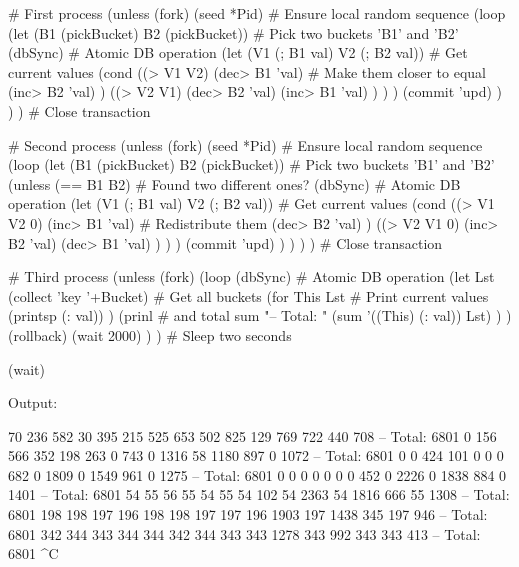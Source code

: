 \begin{wideverbatim}

# First process
(unless (fork)
   (seed *Pid)  # Ensure local random sequence
   (loop
      (let (B1 (pickBucket)  B2 (pickBucket))  # Pick two buckets 'B1' and 'B2'
         (dbSync)                              # Atomic DB operation
         (let (V1 (; B1 val)  V2 (; B2 val))   # Get current values
            (cond
               ((> V1 V2)
                  (dec> B1 'val)               # Make them closer to equal
                  (inc> B2 'val) )
               ((> V2 V1)
                  (dec> B2 'val)
                  (inc> B1 'val) ) ) )
         (commit 'upd) ) ) )                   # Close transaction

\end{wideverbatim}

\begin{wideverbatim}

# Second process
(unless (fork)
   (seed *Pid)  # Ensure local random sequence
   (loop
      (let (B1 (pickBucket)  B2 (pickBucket))  # Pick two buckets 'B1' and 'B2'
         (unless (== B1 B2)                    # Found two different ones?
            (dbSync)                              # Atomic DB operation
            (let (V1 (; B1 val)  V2 (; B2 val))   # Get current values
               (cond
                  ((> V1 V2 0)
                     (inc> B1 'val)               # Redistribute them
                     (dec> B2 'val) )
                  ((> V2 V1 0)
                     (inc> B2 'val)
                     (dec> B1 'val) ) ) )
            (commit 'upd) ) ) ) )                 # Close transaction


\end{wideverbatim}

\begin{wideverbatim}

# Third process
(unless (fork)
   (loop
      (dbSync)                         # Atomic DB operation
      (let Lst (collect 'key '+Bucket) # Get all buckets
         (for This Lst                 # Print current values
            (printsp (: val)) )
         (prinl                        # and total sum
            "-- Total: "
            (sum '((This) (: val)) Lst) ) )
      (rollback)
      (wait 2000) ) )                  # Sleep two seconds

(wait)

\end{wideverbatim}

\begin{wideverbatim}

Output:

70 236 582 30 395 215 525 653 502 825 129 769 722 440 708 -- Total: 6801
0 156 566 352 198 263 0 743 0 1316 58 1180 897 0 1072 -- Total: 6801
0 0 424 101 0 0 0 682 0 1809 0 1549 961 0 1275 -- Total: 6801
0 0 0 0 0 0 0 452 0 2226 0 1838 884 0 1401 -- Total: 6801
54 55 56 55 54 55 54 102 54 2363 54 1816 666 55 1308 -- Total: 6801
198 198 197 196 198 198 197 197 196 1903 197 1438 345 197 946 -- Total: 6801
342 344 343 344 344 342 344 343 343 1278 343 992 343 343 413 -- Total: 6801
^C

\end{wideverbatim}

